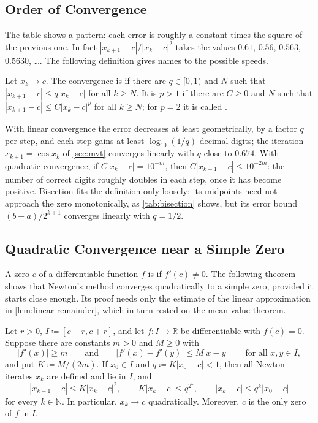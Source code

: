 \subsection{Order of Convergence}

The table shows a pattern: each error is roughly a constant times the square of the previous one. In fact $|x_{k+1}-c|/|x_k-c|^2$ takes the values $0.61$, $0.56$, $0.563$, $0.5630$, \ldots. The following definition gives names to the possible speeds.

\begin{definition}
\label{def:convergence-order}
Let $x_k\to c$. The convergence is  if there are $q\in[0,1)$ and $N$ such that $|x_{k+1}-c|\le q|x_k-c|$ for all $k\ge N$. It is  $p>1$ if there are $C\ge0$ and $N$ such that $|x_{k+1}-c|\le C|x_k-c|^p$ for all $k\ge N$; for $p=2$ it is called .
\end{definition}

With linear convergence the error decreases at least geometrically, by a factor $q$ per step, and each step gains at least $\log_{10}(1/q)$ decimal digits; the iteration $x_{k+1}=\cos x_k$ of \cref{sec:mvt} converges linearly with $q$ close to $0.674$. With quadratic convergence, if $C|x_k-c|=10^{-m}$, then $C|x_{k+1}-c|\le10^{-2m}$: the number of correct digits roughly doubles in each step, once it has become positive. Bisection fits the definition only loosely: its midpoints need not approach the zero monotonically, as \cref{tab:bisection} shows, but its error bound $(b-a)/2^{k+1}$ converges linearly with $q=1/2$.

\subsection{Quadratic Convergence near a Simple Zero}

A zero $c$ of a differentiable function $f$ is  if $f'(c)\ne0$. The following theorem shows that Newton's method converges quadratically to a simple zero, provided it starts close enough. Its proof needs only the estimate of the linear approximation in \cref{lem:linear-remainder}, which in turn rested on the mean value theorem.

\begin{theorem}
\label{thm:newton-quadratic}
Let $r>0$, $I\coloneqq[c-r,c+r]$, and let $f\colon I\to\mathbb R$ be differentiable with $f(c)=0$. Suppose there are constants $m>0$ and $M\ge0$ with
\[
|f'(x)|\ge m\qquad\text{and}\qquad|f'(x)-f'(y)|\le M|x-y|\qquad\text{for all }x,y\in I,
\]
and put $K\coloneqq M/(2m)$. If $x_0\in I$ and $q\coloneqq K|x_0-c|<1$, then all Newton iterates $x_k$ are defined and lie in $I$, and
\[
|x_{k+1}-c|\le K|x_k-c|^2,\qquad K|x_k-c|\le q^{2^k},\qquad|x_k-c|\le q^k|x_0-c|
\]
for every $k\in\mathbb N$. In particular, $x_k\to c$ quadratically. Moreover, $c$ is the only zero of $f$ in $I$.
\end{theorem}

